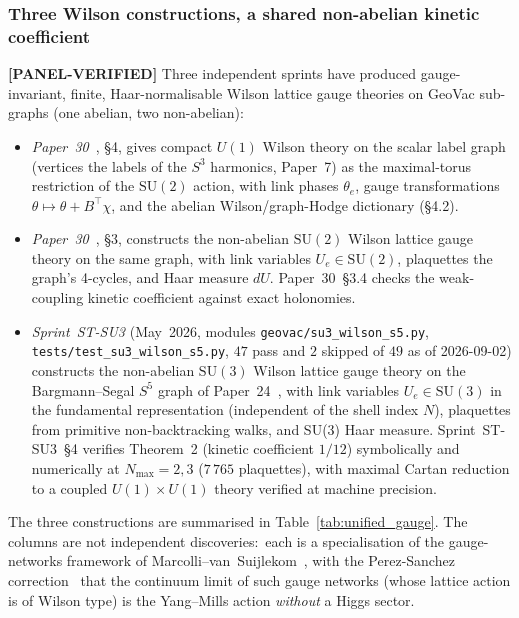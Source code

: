 \documentclass[11pt]{article}
\begin{document}
\subsubsection*{Three Wilson constructions, a shared non-abelian kinetic coefficient}

\textbf{[PANEL-VERIFIED]} Three independent sprints have produced gauge-invariant, finite,
Haar-normalisable Wilson lattice gauge theories on GeoVac sub-graphs
(one abelian, two non-abelian):

\begin{itemize}\setlength{\itemsep}{2pt}
\item \emph{Paper~30}~\cite{paper30}, \S 4, gives compact $U(1)$
Wilson theory on the scalar label graph (vertices the labels of the
$S^3$ harmonics, Paper~7) as the maximal-torus restriction of the
$\mathrm{SU}(2)$ action, with link phases $\theta_e$, gauge
transformations $\theta \mapsto \theta + B^{\top}\chi$, and the
abelian Wilson/graph-Hodge dictionary (\S 4.2).
\item \emph{Paper~30}~\cite{paper30}, \S 3, constructs the non-abelian
$\mathrm{SU}(2)$ Wilson lattice gauge theory on the same graph, with
link variables $U_e \in \mathrm{SU}(2)$, plaquettes the graph's
4-cycles, and Haar measure $dU$.  Paper~30~\S 3.4 checks the
weak-coupling kinetic coefficient against exact holonomies.
\item \emph{Sprint~ST-SU3} (May~2026, modules
\texttt{geovac/su3\_wilson\_s5.py},
\texttt{tests/test\_su3\_wilson\_s5.py}, $47$ pass and $2$ skipped
of $49$ as of 2026-09-02) constructs
the non-abelian $\mathrm{SU}(3)$ Wilson lattice gauge theory on the
Bargmann--Segal $S^5$ graph of Paper~24~\cite{paper24}, with link
variables $U_e \in \mathrm{SU}(3)$ in the fundamental representation
(independent of the shell index $N$), plaquettes from primitive
non-backtracking walks, and SU(3) Haar measure.  Sprint~ST-SU3~\S 4
verifies Theorem~2 (kinetic coefficient $1/12$) symbolically and
numerically at $N_{\max} = 2, 3$ ($7\,765$ plaquettes), with maximal
Cartan reduction to a coupled $U(1) \times U(1)$ theory verified at
machine precision.
\end{itemize}

The three constructions are summarised in
Table~\ref{tab:unified_gauge}.  The columns are not independent
discoveries:\ each is a specialisation of the gauge-networks
framework of Marcolli--van~Suijlekom~\cite{marcolli_vs2014}, with
the Perez-Sanchez correction~\cite{perez_sanchez2025} that the
continuum limit of such gauge networks (whose lattice action is of
Wilson type) is the Yang--Mills action \emph{without} a Higgs sector.
\end{document}
